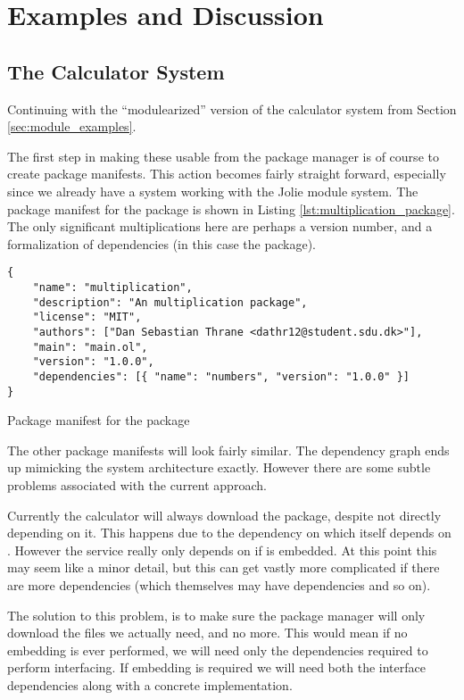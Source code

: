 \section{Examples and Discussion}

\subsection{The Calculator System}

Continuing with the ``modulearized'' version of the calculator system from
Section \ref{sec:module_examples}.

The first step in making these usable from the package manager is of course to
create package manifests. This action becomes fairly straight forward,
especially since we already have a system working with the Jolie module system.
The package manifest for the  package is shown in Listing
\ref{lst:multiplication_package}. The only significant multiplications here are
perhaps a version number, and a formalization of dependencies (in this case the
 package).

\begin{listing}[H]
\begin{verbatim}
{
    "name": "multiplication",
    "description": "An multiplication package",
    "license": "MIT",
    "authors": ["Dan Sebastian Thrane <dathr12@student.sdu.dk>"],
    "main": "main.ol",
    "version": "1.0.0",
    "dependencies": [{ "name": "numbers", "version": "1.0.0" }]
}
\end{verbatim}
\caption{Package manifest for the  package}
\label{lst:multiplication_package}
\end{listing}

The other package manifests will look fairly similar. The dependency graph ends
up mimicking the system architecture exactly. However there are some subtle
problems associated with the current approach.

Currently the calculator will always download the  package,
despite not directly depending on it. This happens due to the dependency on
 which itself depends on . However the
 service really only depends on  if
 is embedded. At this point this may seem like a minor
detail, but this can get vastly more complicated if there are more dependencies
(which themselves may have dependencies and so on).

The solution to this problem, is to make sure the package manager will only
download the files we actually need, and no more. This would mean if no
embedding is ever performed, we will need only the dependencies required to
perform interfacing. If embedding is required we will need both the interface
dependencies along with a concrete implementation.

